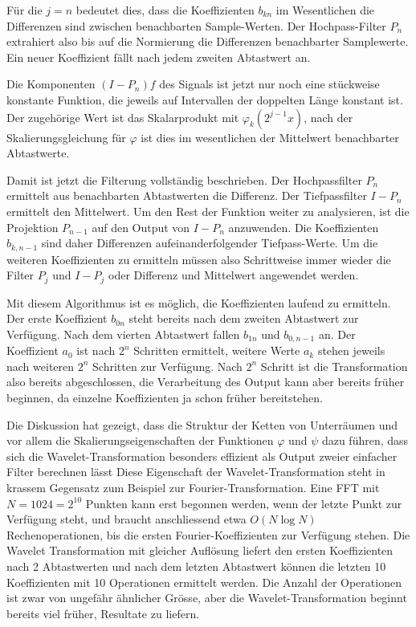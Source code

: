 Für die $j=n$ bedeutet dies, dass die Koeffizienten $b_{kn}$ im Wesentlichen
die Differenzen sind zwischen benachbarten Sample-Werten.
Der Hochpass-Filter $P_n$ extrahiert also bis auf die Normierung
die Differenzen benachbarter Samplewerte.
Ein neuer Koeffizient fällt nach jedem zweiten Abtastwert an.

Die Komponenten $(I-P_n)f$ des Signals ist jetzt nur noch eine stückweise
konstante Funktion, die jeweils auf Intervallen der doppelten Länge konstant
ist.
Der zugehörige Wert ist das Skalarprodukt mit $\varphi_k(2^{j-1}x)$, nach
der Skalierungsgleichung für $\varphi$ ist dies im wesentlichen der
Mittelwert benachbarter Abtastwerte.

Damit ist jetzt die Filterung vollständig beschrieben.
Der Hochpassfilter $P_n$ ermittelt aus benachbarten Abtastwerten die
Differenz.
Der Tiefpassfilter $I-P_n$ ermittelt den Mittelwert.
Um den Rest der Funktion weiter zu analysieren, ist die Projektion $P_{n-1}$
auf den Output von $I-P_n$ anzuwenden.
Die Koeffizienten $b_{k,n-1}$ sind daher Differenzen aufeinanderfolgender
Tiefpass-Werte.
Um die weiteren Koeffizienten zu ermitteln müssen also Schrittweise
immer wieder die Filter $P_j$ und $I-P_j$ oder Differenz und Mittelwert
angewendet werden.

Mit diesem Algorithmus ist es möglich, die Koeffizienten laufend zu ermitteln.
Der erste Koeffizient $b_{0n}$ steht bereits nach dem zweiten Abtastwert zur
Verfügung.
Nach dem vierten Abtastwert fallen $b_{1n}$ und $b_{0,n-1}$ an.
Der Koeffizient $a_0$ ist nach $2^n$ Schritten ermittelt, weitere
Werte $a_k$ stehen jeweils nach weiteren $2^n$ Schritten zur Verfügung.
Nach $2^n$ Schritt ist die Transformation also bereits abgeschlossen,
die Verarbeitung des Output kann aber bereits früher beginnen, da einzelne
Koeffizienten ja schon früher bereitstehen.

Die Diskussion hat gezeigt, dass die Struktur der Ketten von Unterräumen
und vor allem die Skalierungseigenschaften der Funktionen $\varphi$ und $\psi$
dazu führen, dass sich die Wavelet-Transformation besonders effizient
als Output zweier einfacher Filter berechnen lässt
Diese Eigenschaft der Wavelet-Transformation steht in krassem Gegensatz
zum Beispiel zur Fourier-Transformation.
Eine FFT mit $N=1024=2^{10}$ Punkten kann erst begonnen werden, wenn der
letzte Punkt zur Verfügung steht, und braucht anschliessend etwa
$O(N\log N)$ Rechenoperationen, bis die ersten Fourier-Koeffizienten zur
Verfügung stehen.
Die Wavelet Transformation mit gleicher Auflösung liefert den ersten Koeffizienten nach 2 Abtastwerten und nach dem letzten Abtastwert können die letzten 10
Koeffizienten mit 10 Operationen ermittelt werden.
Die Anzahl der Operationen ist zwar von ungefähr ähnlicher Grösse, aber
die Wavelet-Transformation beginnt bereits viel früher, Resultate zu
liefern.

